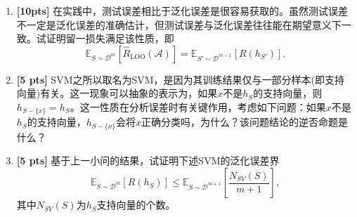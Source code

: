 \documentclass[a4paper,UTF8]{article}
\theoremstyle{definition}
\begin{document}
\begin{enumerate}[(1)]
	\item \textbf{[10pts]} 在实践中，测试误差相比于泛化误差是很容易获取的。虽然测试误差不一定是泛化误差的准确估计，但测试误差与泛化误差往往能在期望意义下一致。试证明留一损失满足该性质，即
	\begin{equation}
		\mathbb{E}_{S \sim \mathcal{D}^m} [ \hat{R}_{\text{LOO} }(\mathcal{A}) ] = \mathbb{E}_{S' \sim \mathcal{D}^{m-1}} [ R(h_{S'}) ] . 
	\end{equation}
	\item \textbf{[5 pts]} SVM之所以取名为SVM，是因为其训练结果仅与一部分样本(即支持向量)有关。这一现象可以抽象的表示为，如果$x$不是$h_S$的支持向量，则$h_{S-\{x\}} = h_S$。这一性质在分析误差时有关键作用，考虑如下问题：如果$x$不是$h_S$的支持向量，$h_{S-\{x\}}$会将$x$正确分类吗，为什么？该问题结论的逆否命题是什么？
	\item \textbf{[5 pts]} 基于上一小问的结果，试证明下述SVM的泛化误差界
	\begin{equation}
		\mathbb{E}_{S \sim \mathcal{D}^m}[ R(h_S) ] \leq \mathbb{E}_{S \sim \mathcal{D}^{m+1}} \left[ \frac{N_{SV}(S)}{m+1} \right] , 
	\end{equation}
	其中$N_{SV}(S)$为$h_S$支持向量的个数。
\end{enumerate}
\end{document}

